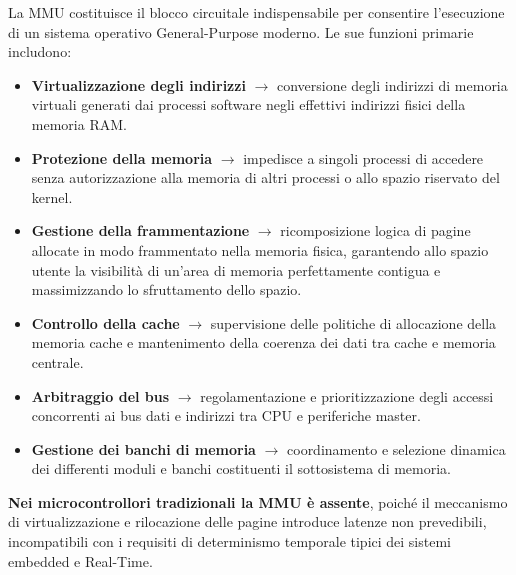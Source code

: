 La MMU costituisce il blocco circuitale indispensabile per consentire l'esecuzione di un sistema operativo General-Purpose moderno. Le sue funzioni primarie includono:
\begin{itemize}
    \item \textbf{Virtualizzazione degli indirizzi} $\rightarrow$ conversione degli indirizzi di memoria virtuali generati dai processi software negli effettivi indirizzi fisici della memoria RAM.
    \item \textbf{Protezione della memoria} $\rightarrow$ impedisce a singoli processi di accedere senza autorizzazione alla memoria di altri processi o allo spazio riservato del kernel.
    \item \textbf{Gestione della frammentazione} $\rightarrow$ ricomposizione logica di pagine allocate in modo frammentato nella memoria fisica, garantendo allo spazio utente la visibilità di un'area di memoria perfettamente contigua e massimizzando lo sfruttamento dello spazio.
    \item \textbf{Controllo della cache} $\rightarrow$ supervisione delle politiche di allocazione della memoria cache e mantenimento della coerenza dei dati tra cache e memoria centrale.
    \item \textbf{Arbitraggio del bus} $\rightarrow$ regolamentazione e prioritizzazione degli accessi concorrenti ai bus dati e indirizzi tra CPU e periferiche master.
    \item \textbf{Gestione dei banchi di memoria} $\rightarrow$ coordinamento e selezione dinamica dei differenti moduli e banchi costituenti il sottosistema di memoria.
\end{itemize}

\textbf{Nei microcontrollori tradizionali la MMU è assente}, poiché il meccanismo di virtualizzazione e rilocazione delle pagine introduce latenze non prevedibili, incompatibili con i requisiti di determinismo temporale tipici dei sistemi embedded e Real-Time.

